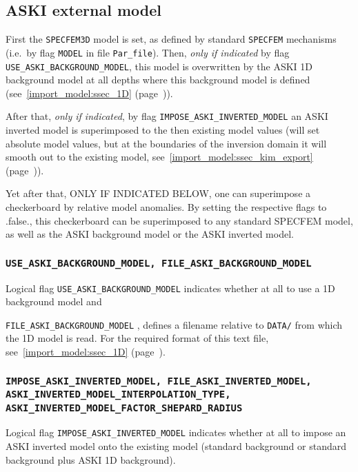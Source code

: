 \documentclass[12pt,a4paper]{article}
\newcommand{\lcode}[1]{\nolinkurl{#1}}
\newcommand{\lcodetitle}[1]{ {\ttfamily #1} }
\newcommand{\ASKI}{ {\ttfamily ASKI} }
\newcommand{\myref}[1]{\ref{#1} (page~\pageref{#1})}
\begin{document}
\subsection{\lcodetitle{ASKI} external model} \label{Par_file_ASKI,sub:ext_model}
First the \lcode{SPECFEM3D} model is set, as defined by standard \lcode{SPECFEM} mechanisms (i.e.\ by
flag \lcode{MODEL} in file \lcode{Par_file}). 
Then, \emph{only if indicated} by flag \lcode{USE_ASKI_BACKGROUND_MODEL}, this model is overwritten 
by the \ASKI{} 1D background model at all depths where this background model is defined 
(see~\myref{import_model:ssec_1D}).

After that, \emph{only if indicated}, by flag \lcode{IMPOSE_ASKI_INVERTED_MODEL} an \ASKI{} inverted 
model is superimposed to the then existing model values (will set absolute model values, 
but at the boundaries of the inversion domain it will smooth out to the existing model, 
see~\myref{import_model:ssec_kim_export}).

Yet after that, ONLY IF INDICATED BELOW, one can superimpose a checkerboard by relative model anomalies. By setting 
the respective flags to .false., this checkerboard can be superimposed to any standard SPECFEM model, as well as the ASKI background model
or the ASKI inverted model. 

\subsubsection*{\lcode{USE_ASKI_BACKGROUND_MODEL, FILE_ASKI_BACKGROUND_MODEL}}
Logical flag \lcode{USE_ASKI_BACKGROUND_MODEL} indicates whether at all to use a 1D background model and

\lcode{FILE_ASKI_BACKGROUND_MODEL} , defines a filename relative to \lcode{DATA/} from which the 1D model
is read. For the required format of this text file, see~\myref{import_model:ssec_1D}.

\subsubsection*{\lcode{IMPOSE_ASKI_INVERTED_MODEL, FILE_ASKI_INVERTED_MODEL, ASKI_INVERTED_MODEL_INTERPOLATION_TYPE, 
ASKI_INVERTED_MODEL_FACTOR_SHEPARD_RADIUS}}
Logical flag \lcode{IMPOSE_ASKI_INVERTED_MODEL} indicates whether at all to impose an \ASKI{} inverted model
onto the existing model (standard background or standard background plus \ASKI{} 1D background).
\end{document}
